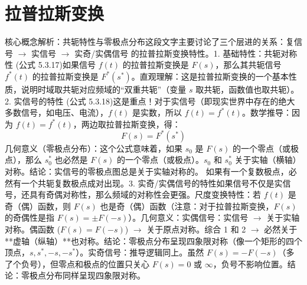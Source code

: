 \chapter{拉普拉斯变换}
核心概念解析：共轭特性与零极点分布这段文字主要讨论了三个层进的关系：复信号 $\rightarrow$ 实信号 $\rightarrow$ 实奇/实偶信号 的拉普拉斯变换特性。1. 基础特性：共轭对称性 (公式 5.3.17)如果信号 $f(t)$ 的拉普拉斯变换是 $F(s)$，那么其共轭信号 $f^*(t)$ 的拉普拉斯变换是 $F^*(s^*)$。直观理解：这是拉普拉斯变换的一个基本性质，说明时域取共轭对应频域的“双重共轭”（变量 $s$ 取共轭，函数值也取共轭）。2. 实信号的特性 (公式 5.3.18)这是重点！对于实信号（即现实世界中存在的绝大多数信号，如电压、电流），$f(t)$ 是实数，所以 $f(t) = f^*(t)$。数学推导：因为 $f(t) = f^*(t)$，两边取拉普拉斯变换，得：$$F(s) = F^*(s^*)$$几何意义（零极点分布）：这个公式意味着，如果 $s_0$ 是 $F(s)$ 的一个零点（或极点），那么 $s_0^*$ 也必然是 $F(s)$ 的一个零点（或极点）。$s_0$ 和 $s_0^*$ 关于实轴（横轴）对称。结论：实信号的零极点图总是关于实轴对称的。 如果有一个复数极点，必然有一个共轭复数极点成对出现。3. 实奇/实偶信号的特性如果信号不仅是实信号，还具有奇偶对称性，那么频域的对称性会更强。尺度变换特性：若 $f(t)$ 是奇（偶）函数，则 $F(s)$ 也是奇（偶）函数（注意：对于拉普拉斯变换，$F(s)$ 的奇偶性是指 $F(s) = \pm F(-s)$）。几何意义：实偶信号：实信号 $\rightarrow$ 关于实轴对称。偶函数 ($F(s)=F(-s)$) $\rightarrow$ 关于原点对称。综合 1 和 2 $\rightarrow$ 必然关于**虚轴（纵轴）**也对称。结论：零极点分布呈现四象限对称（像一个矩形的四个顶点，$s, s^*, -s, -s^*$）。实奇信号：推导逻辑同上。虽然 $F(s) = -F(-s)$（多了个负号），但零点和极点的位置只关心 $F(s)=0$ 或 $\infty$，负号不影响位置。结论：零极点分布同样呈现四象限对称。